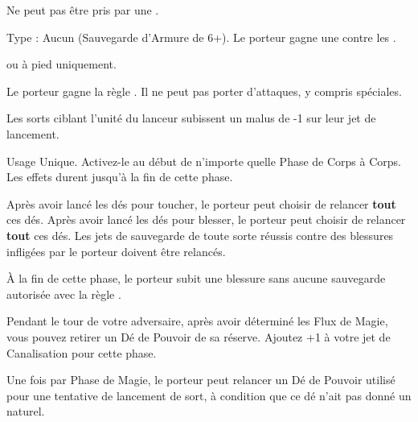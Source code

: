 \armymagicalarmour

\startpricelist

Ne peut pas être pris par une \largetarget{}.

Type : Aucun (Sauvegarde d'Armure de 6+). Le porteur gagne une  contre les \magicalattacks{}.

\endpricelist

\armytalismans

\startpricelist

\archmage{} ou \mage{} à pied uniquement.

Le porteur gagne la règle \ethereal{}. Il ne peut pas porter d'attaques, y compris spéciales.

\endpricelist

\armyenchanteditems

\startpricelist

Les sorts ciblant l'unité du lanceur subissent un malus de -1 sur leur jet de lancement.

Usage Unique. Activez-le au début de n'importe quelle Phase de Corps à Corps. Les effets durent jusqu'à la fin de cette phase.

Après avoir lancé les dés pour toucher, le porteur peut choisir de relancer \textbf{tout} ces dés. Après avoir lancé les dés pour blesser, le porteur peut choisir de relancer \textbf{tout} ces dés. Les jets de sauvegarde de toute sorte réussis contre des blessures infligées par le porteur doivent être relancés.

À la fin de cette phase, le porteur subit une blessure sans aucune sauvegarde autorisée avec la règle .

\endpricelist

\columnbreak
\armyarcaneitems

\startpricelist

Pendant le tour de votre adversaire, après avoir déterminé les Flux de Magie, vous pouvez retirer un Dé de Pouvoir de sa réserve. Ajoutez +1 à votre jet de Canalisation pour cette phase.

Une fois par Phase de Magie, le porteur peut relancer un Dé de Pouvoir utilisé pour une tentative de lancement de sort, à condition que ce dé n'ait pas donné un  naturel.

\endpricelist

